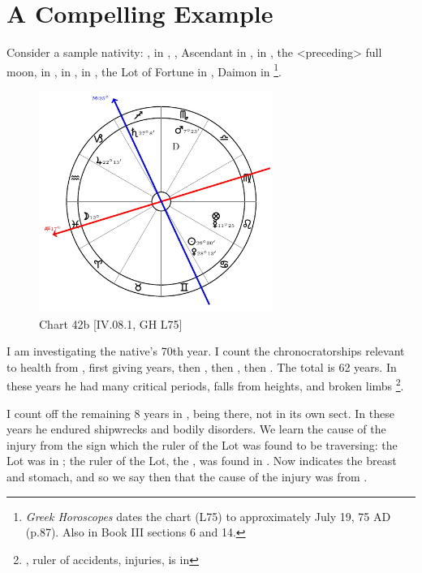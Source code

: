 \section{A Compelling Example}

Consider a sample nativity: \Sun, \Venus\xspace in \Cancer, \Moon, Ascendant in \Pisces, \Saturn\xspace in \Sagittarius,
the <preceding> full moon, \Jupiter\xspace in \Capricorn, \Mars\xspace in \Scorpio, \Mercury\xspace in \Leo, the Lot of Fortune in \Leo, Daimon\xspace in \Scorpio
\footnote{\textit{Greek Horoscopes} dates the chart (L75) to approximately July 19, 75 AD (p.87). Also in Book III sections 6 and 14.}. 

\clearpage
\begin{figure}
\centering
\vspace{-20pt}
\includegraphics[width=0.68\textwidth]{charts/4_08_1}
\caption{Chart 42b [IV.08.1, GH L75]}
\label{fig:chart42b}
\end{figure} 

I am investigating the native’s 70th year. I count the chronocratorships relevant to health from \Leo\xspace <the Lot of Fortune>, first giving \Leo\xspace 19 years, then \Virgo\xspace 20, then \Libra\xspace 8, then \Scorpio\xspace 15. The total is 62 years. In these years he had many critical periods, falls from heights, and broken limbs \footnote{\Mars\xspace, ruler of accidents, injuries, is in \Scorpio}. 

I count off the remaining 8 years in \Sagittarius,\Saturn\xspace being there, not in its own sect. In these years he endured shipwrecks and bodily disorders. We learn the cause of the injury from the sign which the ruler of the Lot was found to be traversing: the Lot was in \Leo; the ruler of the Lot, the \Sun, was found in \Cancer. Now \Cancer\xspace indicates the breast and stomach, and so we say then that the cause of the injury was from \Cancer. 

